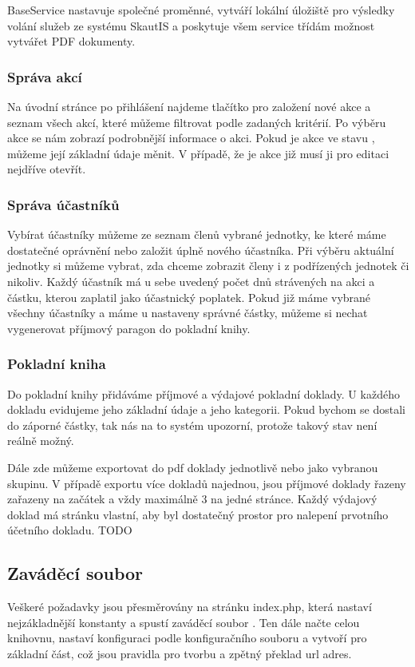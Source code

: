 \documentclass[thesis=B,czech]{FITthesis}[2011/06/14]
\begin{document}
BaseService nastavuje společné proměnné, vytváří lokální úložiště pro výsledky volání služeb ze systému SkautIS a poskytuje všem service třídám možnost vytvářet PDF dokumenty.

\subsubsection{Správa akcí}
Na úvodní stránce po přihlášení najdeme tlačítko pro založení nové akce a seznam všech akcí, které můžeme filtrovat podle zadaných kritérií. Po výběru akce se nám zobrazí podrobnější informace o akci. Pokud je akce ve stavu , můžeme její základní údaje měnit. V případě, že je akce již  musí ji pro editaci nejdříve otevřít.

\subsubsection{Správa účastníků}
Vybírat účastníky můžeme ze seznam členů vybrané jednotky, ke které máme dostatečné oprávnění nebo založit úplně nového účastníka. Při výběru aktuální jednotky si můžeme vybrat, zda chceme zobrazit členy i z podřízených jednotek či nikoliv. Každý účastník má u sebe uvedený počet dnů strávených na akci a částku, kterou zaplatil jako účastnický poplatek. Pokud již máme vybrané všechny účastníky a máme u nastaveny správné částky, můžeme si nechat vygenerovat příjmový paragon do pokladní knihy.

\subsubsection{Pokladní kniha}
Do pokladní knihy přidáváme příjmové a výdajové pokladní doklady. U každého dokladu evidujeme jeho základní údaje a jeho kategorii. Pokud bychom se dostali do záporné částky, tak nás na to systém upozorní, protože takový stav není reálně možný.

Dále zde můžeme exportovat do pdf doklady jednotlivě nebo jako vybranou skupinu. V případě exportu více dokladů najednou, jsou příjmové doklady řazeny zařazeny na začátek a vždy maximálně 3 na jedné stránce. Každý výdajový doklad má stránku vlastní, aby byl dostatečný prostor pro nalepení prvotního účetního dokladu.  TODO






\subsection{Zaváděcí soubor}
Veškeré požadavky jsou přesměrovány na stránku index.php, která nastaví nejzákladnější konstanty a spustí zaváděcí soubor . Ten dále načte celou knihovnu, nastaví konfiguraci podle konfiguračního souboru a vytvoří  pro základní část, což jsou pravidla pro tvorbu a zpětný překlad url adres. 
\end{document}
